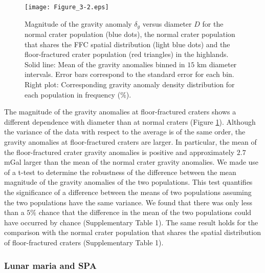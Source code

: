 \begin{figure}[pb]
    \graphicspath{ {/Users/thorey/Documents/These/Projet/FFC/Gravi_GRAIL/Article/Papier/Proof/} }
  \begin{center}

    \texttt{[image: Figure\_3-2.eps]}
    \caption{Magnitude  of  the   gravity  anomaly  $\delta_g$  versus
      diameter $D$ for  the normal crater population  (blue dots), the
      normal   crater  population   that   shares   the  FFC   spatial
      distribution (light  blue dots)  and the  floor-fractured crater
      population (red triangles) in the highlands. Solid line: Mean of
      the  gravity anomalies  binned  in $15$  km diameter  intervals.
      Error bars correspond to the standard error for each bin.  Right
      plot:  Corresponding gravity  anomaly  density distribution  for
      each population in frequency ($\%$).}
    \label{Figure3-2}
  \end{center}
\end{figure}

The  magnitude of  the  gravity anomalies  at floor-fractured  craters
shows  a different  dependence with  diameter than  at normal  craters
(Figure  \ref{Figure3-2}).  Although  the  variance of  the data  with
respect to the average is of  the same order, the gravity anomalies at
floor-fractured craters  are larger.  In  particular, the mean  of the
floor-fractured crater gravity anomalies is positive and approximately
$2.7$  mGal  larger  than  the  mean  of  the  normal  crater  gravity
anomalies.  We made use of a t-test to determine the robustness of the
difference between the mean magnitude  of the gravity anomalies of the
two  populations.    This  test  quantifies  the   significance  of  a
difference  between the  means  of two  populations  assuming the  two
populations have the same variance.  We found that there was only less
than  a $5\%$  chance  that the  difference  in the  mean  of the  two
populations  could have  occurred by  chance (Supplementary  Table 1).
The  same result  holds  for  the comparison  with  the normal  crater
population  that shares  the spatial  distribution of  floor-fractured
craters (Supplementary Table 1).

\subsubsection{Lunar maria and SPA}
\label{sec:lunar-maria-spa}
  
